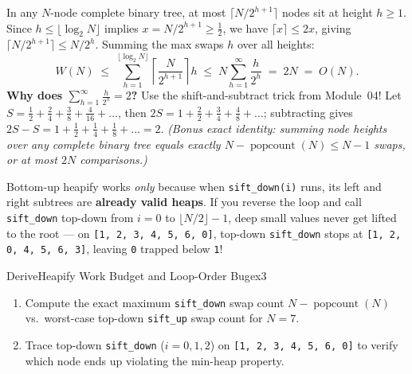 \documentclass[11pt,a4paper]{article}
\theoremstyle{definition}
\begin{document}
\begin{formulabox}
In any $N$-node complete binary tree, at most $\lceil N / 2^{h+1} \rceil$ nodes sit at height $h \ge 1$. Since $h \le \lfloor \log_2 N \rfloor$ implies $x = N / 2^{h+1} \ge \frac{1}{2}$, we have $\lceil x \rceil \le 2x$, giving $\lceil N / 2^{h+1} \rceil \le N / 2^h$. Summing the max swaps $h$ over all heights:
$$W(N) \;\le\; \sum_{h=1}^{\lfloor \log_2 N \rfloor} \left\lceil \frac{N}{2^{h+1}} \right\rceil h \;\le\; N \sum_{h=1}^{\infty} \frac{h}{2^h} \;=\; 2N \;=\; O(N).$$
\textbf{Why does $\sum_{h=1}^{\infty} \frac{h}{2^h} = 2$?} Use the shift-and-subtract trick from Module~04! Let $S = \frac{1}{2} + \frac{2}{4} + \frac{3}{8} + \frac{4}{16} + \dots$, then $2S = 1 + \frac{2}{2} + \frac{3}{4} + \frac{4}{8} + \dots$; subtracting gives $2S - S = 1 + \frac{1}{2} + \frac{1}{4} + \frac{1}{8} + \dots = 2$. \emph{(Bonus exact identity: summing node heights over any complete binary tree equals exactly $N - \operatorname{popcount}(N) \le N - 1$ swaps, or at most $2N$ comparisons.)}
\end{formulabox}

\begin{watchoutbox}
Bottom-up heapify works \emph{only} because when \texttt{sift\_down(i)} runs, its left and right subtrees are \textbf{already valid heaps}. If you reverse the loop and call \texttt{sift\_down} top-down from $i = 0$ to $\lfloor N/2 \rfloor - 1$, deep small values never get lifted to the root --- on \texttt{[1, 2, 3, 4, 5, 6, 0]}, top-down \texttt{sift\_down} stops at \texttt{[1, 2, 0, 4, 5, 6, 3]}, leaving \texttt{0} trapped below \texttt{1}!
\end{watchoutbox}

\begin{tryitbox}{Derive}{Heapify Work Budget and Loop-Order Bug}{ex3}
\begin{enumerate}[itemsep=1pt, topsep=2pt]
    \item Compute the exact maximum \texttt{sift\_down} swap count $N - \operatorname{popcount}(N)$ vs.\ worst-case top-down \texttt{sift\_up} swap count for $N = 7$.
    \item Trace top-down \texttt{sift\_down} ($i = 0, 1, 2$) on \texttt{[1, 2, 3, 4, 5, 6, 0]} to verify which node ends up violating the min-heap property.
\end{enumerate}
\end{tryitbox}
\end{document}
